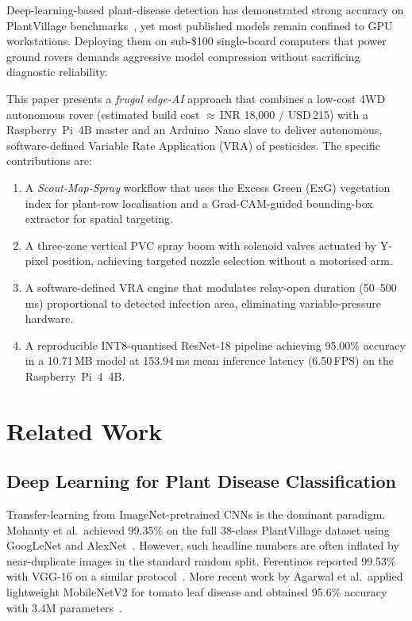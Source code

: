 \documentclass[conference]{IEEEtran}
\begin{document}
Deep-learning-based plant-disease detection has demonstrated strong
accuracy on PlantVillage benchmarks~\cite{b3}, yet most published models
remain confined to GPU workstations. Deploying them on sub-\$100
single-board computers that power ground rovers demands aggressive model
compression without sacrificing diagnostic reliability.

This paper presents a \emph{frugal edge-AI} approach that combines a
low-cost 4WD autonomous rover (estimated build cost $\approx$\,INR
18,000 / USD\,215) with a Raspberry~Pi~4B master and an Arduino~Nano
slave to deliver autonomous, software-defined Variable Rate Application
(VRA) of pesticides. The specific contributions are:
\begin{enumerate}
    \item A \emph{Scout-Map-Spray} workflow that uses the Excess Green
        (ExG) vegetation index for plant-row localisation and a
        Grad-CAM-guided bounding-box extractor for spatial targeting.
    \item A three-zone vertical PVC spray boom with solenoid valves
        actuated by Y-pixel position, achieving targeted nozzle selection
        without a motorised arm.
    \item A software-defined VRA engine that modulates relay-open
        duration (50--500\,ms) proportional to detected infection area,
        eliminating variable-pressure hardware.
    \item A reproducible INT8-quantised ResNet-18 pipeline achieving
        95.00\% accuracy in a 10.71\,MB model at 153.94\,ms mean
        inference latency (6.50\,FPS) on the Raspberry~Pi~4~4B.
\end{enumerate}

\section{Related Work}
\label{sec:related}

\subsection{Deep Learning for Plant Disease Classification}
Transfer-learning from ImageNet-pretrained CNNs is the dominant paradigm.
Mohanty et al.\ achieved 99.35\% on the full 38-class PlantVillage
dataset using GoogLeNet and AlexNet~\cite{b3}. However, such headline
numbers are often inflated by near-duplicate images in the standard
random split. Ferentinos reported 99.53\% with VGG-16 on a similar
protocol~\cite{b4}. More recent work by Agarwal et al.\ applied
lightweight MobileNetV2 for tomato leaf disease and obtained 95.6\%
accuracy with 3.4M parameters~\cite{b5}.
\end{document}
